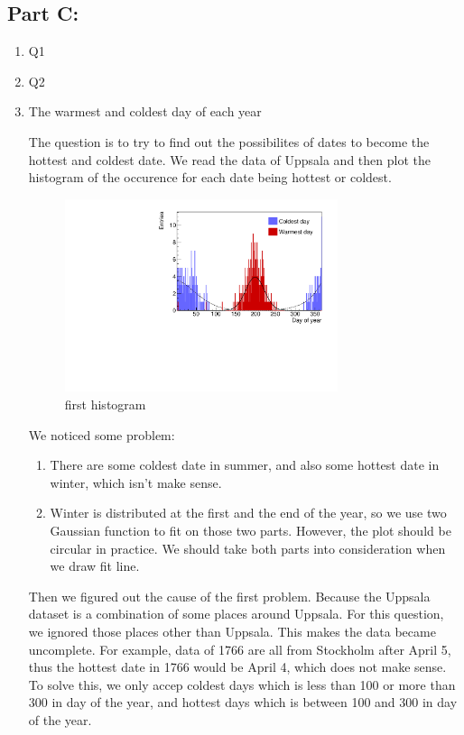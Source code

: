 \documentclass[a4paper]{article}
\begin{document}
\subsection{Part C:}
\begin{enumerate}

\item Q1
\item Q2
\item The warmest and coldest day of each year

The question is to try to find out the possibilites of dates to become the hottest and coldest date. We read the data of Uppsala and then plot the histogram of the occurence for each date being hottest or coldest. 

\begin{figure}[htp]
    \centering
    \includegraphics[width=8cm]{./images/hotCold_Upp_prev}
    \caption{first histogram}
    \label{fig:hist}
\end{figure}

We noticed some problem:
\begin{enumerate}
\item There are some coldest date in summer, and also some hottest date in winter, which isn't make sense.
\item Winter is distributed at the first and the end of the year, so we use two Gaussian function to fit on those two parts. However, the plot should be circular in practice. We should take both parts into consideration when we draw fit line.
\end{enumerate}
Then we figured out the cause of the first problem. Because the Uppsala dataset is a combination of some places around Uppsala. For this question, we ignored those places other than Uppsala. This makes the data became uncomplete. For example, data of 1766 are all from Stockholm after April 5, thus the hottest date in 1766 would be April 4, which does not make sense. To solve this, we only accep coldest days which is less than 100 or more than 300 in day of the year, and hottest days which is between 100 and 300 in day of the year.





\end{enumerate}
\end{document}
